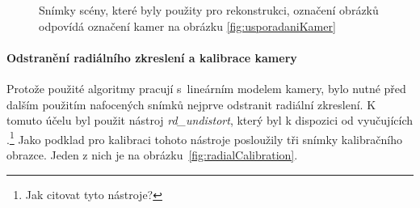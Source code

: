 \documentclass[11pt,oneside,a4paper,pdftex]{article}   %
\begin{document}
\begin{figure}[htbp]
{				\fbox{\begin{minipage}{3cm}\hfill\vspace{4cm}\end{minipage}}
			}
		\caption{Snímky scény, které byly použity pro rekonstrukci, označení obrázků
			odpovídá označení kamer na obrázku \ref{fig:usporadaniKamer}}
		\label{fig:fotografie}
	\end{figure}

\paragraph{Odstranění radiálního zkreslení a kalibrace kamery} Protože použité algoritmy pra\-cují
s~lineárním modelem kamery, bylo nutné před dalším použitím nafocených snímků nej\-prve odstranit
radiální zkreslení. K tomuto účelu byl použit nástroj \emph{rd\_undistort}, který byl k dispozici od
vyučujících \cite{code_repo}.\footnote{Jak citovat tyto nástroje?} Jako podklad pro kalibraci tohoto
nástroje posloužily tři snímky kalibračního obrazce. Jeden z nich je na obrázku~\ref{fig:radialCalibration}.

\def\IAC{\boldsymbol \omega}
\end{document}
